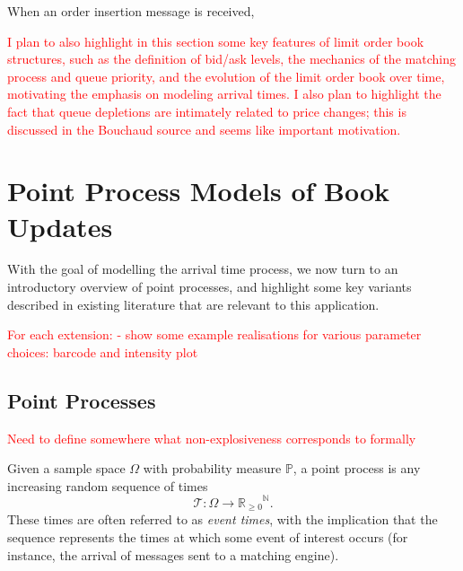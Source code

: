 \documentclass[honours,12pt]{unswthesis}
\numberwithin{equation}{section}
\begin{document}
\medskip

When an order insertion message is received, 







\textcolor{red}{I plan to also highlight in this section some key features of limit order book structures, such as the definition of bid/ask levels, the mechanics of the matching process and queue priority, and the evolution of the limit order book over time, motivating the emphasis on modeling arrival times. I also plan to highlight the fact that queue depletions are intimately related to price changes; this is discussed in the Bouchaud source and seems like important motivation.}

\section{Point Process Models of Book Updates}
With the goal of modelling the arrival time process, we now turn to an introductory overview of point processes, and highlight some key variants described in existing literature that are relevant to this application.

\textcolor{red}{
For each extension:
- show some example realisations for various parameter choices: barcode and intensity plot
}

\subsection{Point Processes}


\textcolor{red}{Need to define somewhere what non-explosiveness corresponds to formally}

Given a sample space $\Omega$ with probability measure $\mathbb P$, a point process is any increasing random sequence of times $$\mathcal T:\Omega\to{\mathbb{R}_{\geq 0}}^\mathbb{N}.$$
These times are often referred to as \textit{event times}, with the implication that the sequence represents the times at which some event of interest occurs (for instance, the arrival of messages sent to a matching engine).
\end{document}
